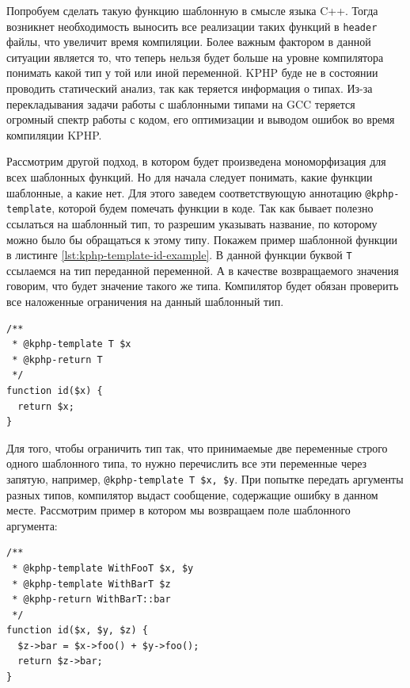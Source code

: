 Попробуем сделать такую функцию шаблонную в смысле языка C++.
Тогда возникнет необходимость выносить все реализации таких функций в \verb|header| файлы, что увеличит время компиляции.
Более важным фактором в данной ситуации является то, что теперь нельзя будет больше на уровне компилятора понимать какой тип у той или иной переменной.
KPHP буде не в состоянии проводить статический анализ, так как теряется информация о типах.
Из-за перекладывания задачи работы с шаблонными типами на GCC \cite{gcc} теряется огромный спектр работы с кодом, его оптимизации и выводом ошибок во время компиляции KPHP.

Рассмотрим другой подход, в котором будет произведена мономорфизация для всех шаблонных функций.
Но для начала следует понимать, какие функции шаблонные, а какие нет.
Для этого заведем соответствующую аннотацию \verb|@kphp-template|, которой будем помечать функции в коде.
Так как бывает полезно ссылаться на шаблонный тип, то разрешим указывать название, по которому можно было бы обращаться к этому типу.
Покажем пример шаблонной функции в листинге \ref{lst:kphp-template-id-example}.
В данной функции буквой \verb|T| ссылаемся на тип переданной переменной.
А в качестве возвращаемого значения говорим, что будет значение такого же типа.
Компилятор будет обязан проверить все наложенные ограничения на данный шаблонный тип.
\begin{lstlisting}[caption={Пример функции id, с применением шаблонов},label={lst:kphp-template-id-example}]
/**
 * @kphp-template T $x
 * @kphp-return T
 */
function id($x) {
  return $x;
}
\end{lstlisting}

Для того, чтобы ограничить тип так, что принимаемые две переменные строго одного шаблонного типа, то нужно перечислить все эти переменные через запятую, например, \verb|@kphp-template T $x, $y|.
При попытке передать аргументы разных типов, компилятор выдаст сообщение, содержащие ошибку в данном месте.
Рассмотрим пример в котором мы возвращаем поле шаблонного аргумента:
\begin{lstlisting}[caption={Пример функции id, с применением шаблонов},label={lst:kphp-dependent-template-example}]
/**
 * @kphp-template WithFooT $x, $y
 * @kphp-template WithBarT $z
 * @kphp-return WithBarT::bar
 */
function id($x, $y, $z) {
  $z->bar = $x->foo() + $y->foo();
  return $z->bar;
}
\end{lstlisting}

